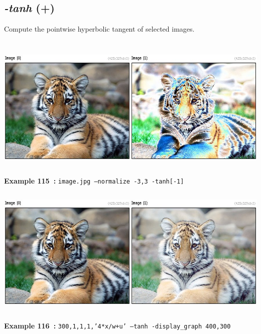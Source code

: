 \documentclass[a4paper,11pt,twoside]{book}
\begin{document}
\subsection{\emph{-tanh} (+)}\vspace*{-0.5em}
Compute the pointwise hyperbolic tangent of selected images.
\begin{center}\includegraphics[keepaspectratio=true,height=7cm,width=\textwidth]{img/gmic_def115.jpg}\\
{\footnotesize \textbf{Example 115~:} \texttt{image.jpg --normalize -3,3 -tanh[-1]}}
\\\includegraphics[keepaspectratio=true,height=7cm,width=\textwidth]{img/gmic_def116.jpg}\\
{\footnotesize \textbf{Example 116~:} \texttt{300,1,1,1,'4*x/w+u' --tanh -display\_graph 400,300}}
\end{center}
\end{document}
